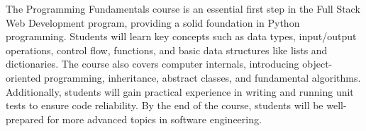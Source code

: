 The Programming Fundamentals course is an essential first step in the Full Stack Web Development program, providing a solid foundation in Python programming.
Students will learn key concepts such as data types, input/output operations, control flow, functions, and basic data structures like lists and dictionaries.
The course also covers computer internals, introducing object-oriented programming, inheritance, abstract classes, and fundamental algorithms.
Additionally, students will gain practical experience in writing and running unit tests to ensure code reliability.
By the end of the course, students will be well-prepared for more advanced topics in software engineering.
